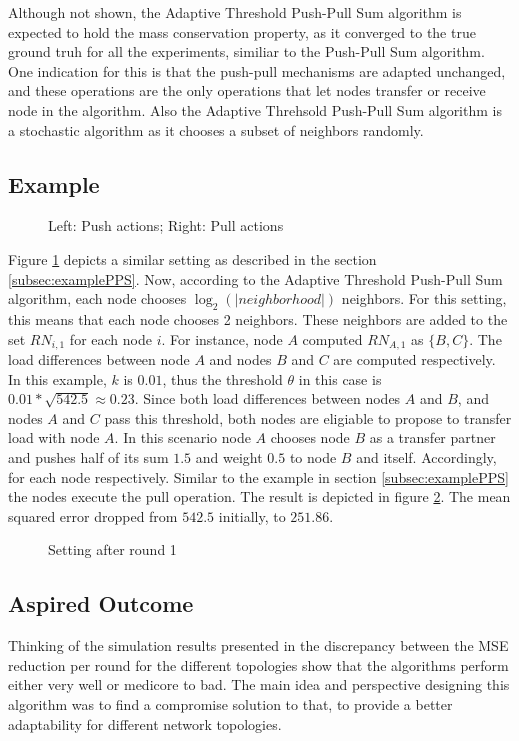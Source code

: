 Although not shown, the Adaptive Threshold Push-Pull Sum algorithm is expected to hold the mass conservation property, as it converged to the true ground truh for all the experiments, similiar to the Push-Pull Sum algorithm. One indication for this is that the push-pull mechanisms are adapted unchanged, and these operations are the only operations that let nodes transfer or receive node in the algorithm. Also the Adaptive Threhsold Push-Pull Sum algorithm is a stochastic algorithm as it chooses a subset of neighbors randomly.

\subsection{Example}\label{subsec:exampleAdaptiveThresholdPPS}
\begin{figure}
    \centering
    
    \caption{Left: Push actions; Right: Pull actions}
    \label{fig:ATPPSExampleSetting}
\end{figure}
Figure \ref{fig:ATPPSExampleSetting} depicts a similar setting as described in the section \ref{subsec:examplePPS}. Now, according to the Adaptive Threshold Push-Pull Sum algorithm, each node chooses $\log_{2}{(|neighborhood|)}$ neighbors. For this setting, this means that each node chooses 2 neighbors. These neighbors are added to the set $RN_{i,1}$ for each node $i$. For instance, node $A$ computed $RN_{A,1}$ as $\{B,C\}$. The load differences between node $A$ and nodes $B$ and $C$ are computed respectively. In this example, $k$ is $0.01$, thus the threshold $\theta$ in this case is $0.01*\sqrt{542.5} \approx 0.23$. Since both load differences between nodes $A$ and $B$, and nodes $A$ and $C$ pass this threshold, both nodes are eligiable to propose to transfer load with node $A$. In this scenario node $A$ chooses node $B$ as a transfer partner and pushes half of its sum $1.5$ and weight $0.5$ to node $B$ and itself. Accordingly, for each node respectively. Similar to the example in section \ref{subsec:examplePPS} the nodes execute the pull operation. The result is depicted in figure \ref{fig:ATPPSExampleResult}. The mean squared error dropped from $542.5$ initially, to $251.86$.
\begin{figure}
    \centering
    
    \caption{Setting after round 1}
    \label{fig:ATPPSExampleResult}
\end{figure}
\subsection{Aspired Outcome}\label{subsec:aspiredOutcomeAdaptiveThresholdPPS}
Thinking of the simulation results presented in \cite{Bayazitoglu} the discrepancy between the MSE reduction per round for the different topologies show that the algorithms perform either very well or medicore to bad. The main idea and perspective designing this algorithm was to find a compromise solution to that, to provide a better adaptability for different network topologies.


